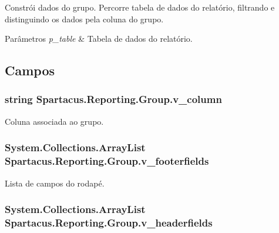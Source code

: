 Constrói dados do grupo. Percorre tabela de dados do relatório, filtrando e distinguindo os dados pela coluna do grupo. 


\begin{DoxyParams}{Parâmetros}
{\em p\+\_\+table} & Tabela de dados do relatório.\\
\hline
\end{DoxyParams}


\subsection{Campos}
\hypertarget{classSpartacus_1_1Reporting_1_1Group_a71fecca561ec4ef4f0993fb31ef092da}{
\subsubsection[{v\+\_\+column}]{\setlength{\rightskip}{0pt plus 5cm}string Spartacus.\+Reporting.\+Group.\+v\+\_\+column}}\label{classSpartacus_1_1Reporting_1_1Group_a71fecca561ec4ef4f0993fb31ef092da}


Coluna associada ao grupo. 

\hypertarget{classSpartacus_1_1Reporting_1_1Group_aeaed3d9bfe7a89a49f816cb07c827517}{
\subsubsection[{v\+\_\+footerfields}]{\setlength{\rightskip}{0pt plus 5cm}System.\+Collections.\+Array\+List Spartacus.\+Reporting.\+Group.\+v\+\_\+footerfields}}\label{classSpartacus_1_1Reporting_1_1Group_aeaed3d9bfe7a89a49f816cb07c827517}


Lista de campos do rodapé. 

\hypertarget{classSpartacus_1_1Reporting_1_1Group_ad05edcde1836bcf084d12ef6a204d244}{
\subsubsection[{v\+\_\+headerfields}]{\setlength{\rightskip}{0pt plus 5cm}System.\+Collections.\+Array\+List Spartacus.\+Reporting.\+Group.\+v\+\_\+headerfields}}\label{classSpartacus_1_1Reporting_1_1Group_ad05edcde1836bcf084d12ef6a204d244}


